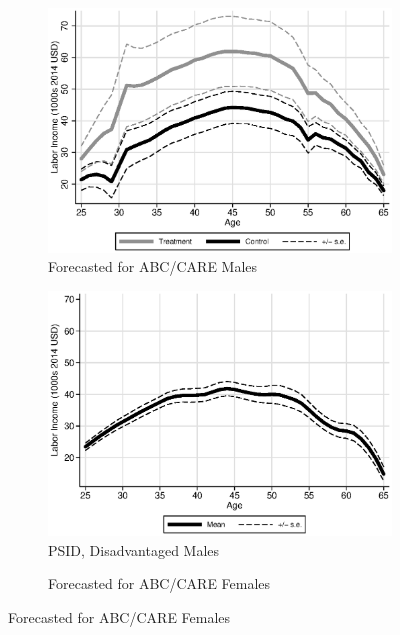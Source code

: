 \begin{figure}
\centering
\caption{Labor Income Profiles}\label{fig:labor-income-profiles}
\begin{subfigure}[h]{0.4\textwidth}
		\centering
		\caption{Forecasted for ABC/CARE Males} \label{fig:abcare1}
		\includegraphics[width=\textwidth]{output/labor_25-60_male.eps}
\end{subfigure}%
\begin{subfigure}[h]{0.4\textwidth}
	\centering
	\caption{PSID, Disadvantaged Males} \label{fig:psid1}
		\includegraphics[width=\textwidth]{output/psid_incomeprofiles_s1.eps}
\end{subfigure}
\begin{subfigure}[h]{0.4\textwidth}
		\centering
		\caption{Forecasted for ABC/CARE Females} \label{fig:abcare0}

\end{subfigure}
\end{figure}
